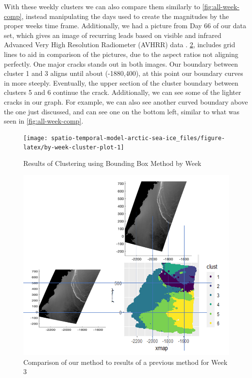 \documentclass[12pt]{article}
\begin{document}
With these weekly clusters we can also compare them similarly to
\cref{fig:all-week-comp}, instead manipulating the days used to create
the magnitudes by the proper weeks time frame. Additionally, we had a
picture from Day 66 of our data set, which gives an image of recurring
leads based on visible and infrared Advanced Very High Resolution
Radiometer (AVHRR) data \citep{lead_pic_2009}. \cref{fig:week-comp},
includes grid lines to aid in comparison of the pictures, due to the
aspect ratios not aligning perfectly. One major cracks stands out in
both images. Our boundary between cluster 1 and 3 aligns until about
(-1880,400), at this point our boundary curves in more steeply.
Eventually, the upper section of the cluster boundary between clusters 5
and 6 continue the crack. Additionally, we can see some of the lighter
cracks in our graph. For example, we can also see another curved
boundary above the one just discussed, and can see one on the bottom
left, similar to what was seen in \cref{fig:all-week-comp}.

\begin{figure}[tbp]

{\centering \texttt{[image: spatio-temporal-model-arctic-sea-ice\_files/figure-latex/by-week-cluster-plot-1]} 

}

\caption{Results of Clustering using Bounding Box Method by Week}\label{fig:by-week-cluster-plot}
\end{figure}

\begin{figure}[tbp]

{\centering \includegraphics[width=1\linewidth,]{images/week-comp} 

}

\caption{Comparison of our method to results of a previous method for Week 3}\label{fig:week-comp}
\end{figure}
\end{document}
